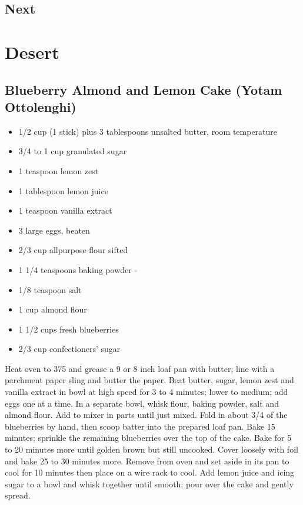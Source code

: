 \documentclass[
  letterpaper,
  DIV=11,
  numbers=noendperiod]{scrreprt}
\providecommand{\tightlist}{%
  \setlength{\itemsep}{0pt}\setlength{\parskip}{0pt}}\usepackage{longtable,booktabs,array}
\begin{document}
\hypertarget{next}{%
\section*{Next}\label{next}}



\hypertarget{desert}{%
\chapter*{Desert}\label{desert}}


\hypertarget{blueberry-almond-and-lemon-cake-yotam-ottolenghi}{%
\section*{Blueberry Almond and Lemon Cake (Yotam
Ottolenghi)}\label{blueberry-almond-and-lemon-cake-yotam-ottolenghi}}


\begin{itemize}
\tightlist
\item
  1/2 cup (1 stick) plus 3 tablespoons unsalted butter, room temperature
\item
  3/4 to 1 cup granulated sugar
\item
  1 teaspoon lemon zest
\item
  1 tablespoon lemon juice
\item
  1 teaspoon vanilla extract
\item
  3 large eggs, beaten
\item
  2/3 cup allpurpose flour sifted
\item
  1 1/4 teaspoons baking powder -
\item
  1/8 teaspoon salt
\item
  1 cup almond flour
\item
  1 1/2 cups fresh blueberries
\item
  2/3 cup confectioners' sugar
\end{itemize}

Heat oven to 375 and grease a 9 or 8 inch loaf pan with butter; line
with a parchment paper sling and butter the paper. Beat butter, sugar,
lemon zest and vanilla extract in bowl at high speed for 3 to 4 minutes;
lower to medium; add eggs one at a time. In a separate bowl, whisk
flour, baking powder, salt and almond flour. Add to mixer in parts until
just mixed. Fold in about 3/4 of the blueberries by hand, then scoop
batter into the prepared loaf pan. Bake 15 minutes; sprinkle the
remaining blueberries over the top of the cake. Bake for 5 to 20 minutes
more until golden brown but still uncooked. Cover loosely with foil and
bake 25 to 30 minutes more. Remove from oven and set aside in its pan to
cool for 10 minutes then place on a wire rack to cool. Add lemon juice
and icing sugar to a bowl and whisk together until smooth; pour over the
cake and gently spread.
\end{document}
